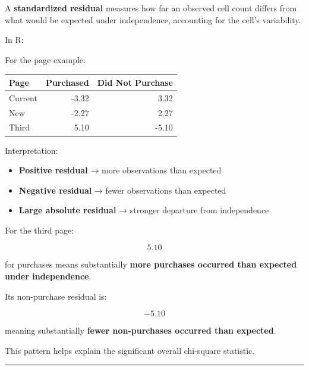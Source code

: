 \documentclass[
  letterpaper,
  DIV=11,
  numbers=noendperiod]{scrreprt}
\newenvironment{Shaded}{\begin{snugshade}}{\end{snugshade}}
\newcommand{\DecValTok}[1]{\textcolor[rgb]{0.68,0.00,0.00}{#1}}
\newcommand{\FunctionTok}[1]{\textcolor[rgb]{0.28,0.35,0.67}{#1}}
\newcommand{\NormalTok}[1]{\textcolor[rgb]{0.00,0.23,0.31}{#1}}
\newcommand{\SpecialCharTok}[1]{\textcolor[rgb]{0.37,0.37,0.37}{#1}}
\newcounter{none} %
\providecommand{\tightlist}{%
  \setlength{\itemsep}{0pt}\setlength{\parskip}{0pt}}
\begin{document}
A \textbf{standardized residual} measures how far an observed cell count
differs from what would be expected under independence, accounting for
the cell's variability.

In R:

\begin{Shaded}
\end{Shaded}

For the page example:

{\def\LTcaptype{none} %
\begin{longtable}[]{@{}lrr@{}}
\toprule\noalign{}
Page & Purchased & Did Not Purchase \\
\midrule\noalign{}
\endhead
\bottomrule\noalign{}
\endlastfoot
Current & -3.32 & 3.32 \\
New & -2.27 & 2.27 \\
Third & 5.10 & -5.10 \\
\end{longtable}
}

Interpretation:

\begin{itemize}
\tightlist
\item
  \textbf{Positive residual} → more observations than expected
\item
  \textbf{Negative residual} → fewer observations than expected
\item
  \textbf{Large absolute residual} → stronger departure from
  independence
\end{itemize}

For the third page:

\[
5.10
\]

for purchases means substantially \textbf{more purchases occurred than
expected under independence}.

Its non-purchase residual is:

\[
-5.10
\]

meaning substantially \textbf{fewer non-purchases occurred than
expected}.

This pattern helps explain the significant overall chi-square statistic.

\begin{center}\rule{0.5\linewidth}{0.5pt}\end{center}
\end{document}
